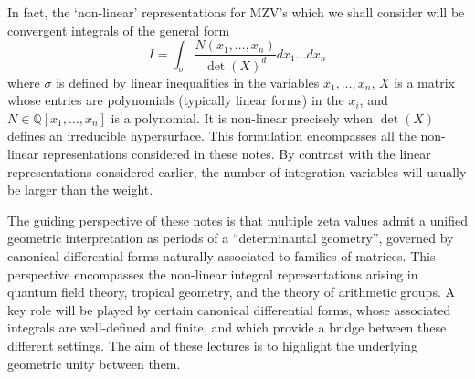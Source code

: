 \documentclass[12pt]{amsart}
\newcommand{\QQ}{{\mathbb Q}}
\theoremstyle{plain}
\newcommand{\0}{\color{blue}{\mathsf{0}}}
\begin{document}
In fact,  the `non-linear'  representations for MZV's which we shall consider will be convergent integrals  of the general  form 
\begin{equation}  \label{introIasdet} I =  \int_{\sigma}  \frac{N(x_1,\ldots, x_n) } { \det (X)^d } dx_1 \ldots dx_n
\end{equation} 
where $\sigma$ is defined by linear inequalities in the  variables $x_1,\ldots, x_n$,  $X$ is a matrix whose entries are polynomials (typically linear forms) in the $x_i$, and $N \in \QQ[x_1,\ldots, x_n]$ is a polynomial.
It is non-linear precisely when $\det(X)$ defines an irreducible hypersurface. 
This formulation encompasses all the non-linear representations considered in these notes.
   By contrast with the linear representations considered earlier, the number of integration variables will usually  be larger  than the weight.




The guiding perspective of these notes is that multiple zeta values admit a unified geometric interpretation as periods of a “determinantal geometry”,  governed by canonical differential forms naturally associated to families of matrices. This perspective encompasses the non-linear integral representations arising in quantum field theory, tropical geometry, and the theory of arithmetic groups. A key role will be played by certain canonical differential forms, whose associated integrals are well-defined and finite, and which provide a bridge between these different settings. The aim of these lectures is to highlight the underlying geometric unity between them.
\end{document}
